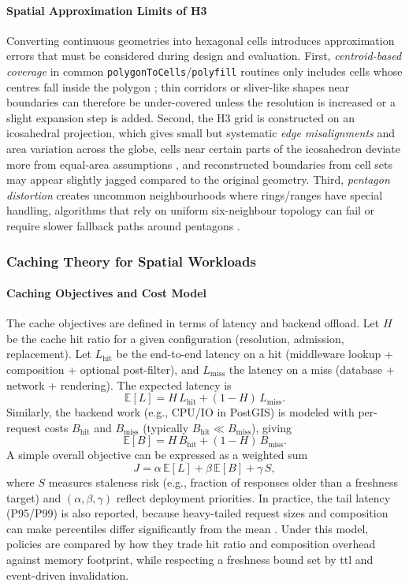 \paragraph{Spatial Approximation Limits of H3}
Converting continuous geometries into hexagonal cells introduces approximation errors that must be considered during design and evaluation. First, \emph{centroid-based coverage} in common \texttt{polygonToCells}/\texttt{polyfill} routines only includes cells whose centres fall inside the polygon \cite{H3_API_Regions}; thin corridors or sliver-like shapes near boundaries can therefore be under-covered unless the resolution is increased or a slight expansion step is added. Second, the H3 grid is constructed on an icosahedral projection, which gives small but systematic \emph{edge misalignments} and area variation across the globe, cells near certain parts of the icosahedron deviate more from equal-area assumptions \cite{H3_Core_ResTable}, and reconstructed boundaries from cell sets may appear slightly jagged compared to the original geometry. Third, \emph{pentagon distortion} creates uncommon neighbourhoods where rings/ranges have special handling, algorithms that rely on uniform six-neighbour topology can fail or require slower fallback paths around pentagons \cite{H3_API_Traversal}.

\subsubsection{Caching Theory for Spatial Workloads}

\paragraph{Caching Objectives and Cost Model}
The cache objectives are defined in terms of latency and backend offload. Let $H$ be the cache hit ratio for a given configuration (resolution, admission, replacement). Let $L_\mathrm{hit}$ be the end-to-end latency on a hit (middleware lookup + composition + optional post-filter), and $L_\mathrm{miss}$ the latency on a miss (database + network + rendering). The expected latency is
\[
\mathbb{E}[L] = H\,L_\mathrm{hit} + (1-H)\,L_\mathrm{miss}.
\]
Similarly, the backend work (e.g., CPU/IO in PostGIS) is modeled with per-request costs $B_\mathrm{hit}$ and $B_\mathrm{miss}$ (typically $B_\mathrm{hit}\!\ll\!B_\mathrm{miss}$), giving
\[
\mathbb{E}[B] = H\,B_\mathrm{hit} + (1-H)\,B_\mathrm{miss}.
\]
A simple overall objective can be expressed as a weighted sum
\[
J = \alpha\,\mathbb{E}[L] + \beta\,\mathbb{E}[B] + \gamma\,S,
\]
where $S$ measures staleness risk (e.g., fraction of responses older than a freshness target) and $(\alpha,\beta,\gamma)$ reflect deployment priorities. In practice, the tail latency (P95/P99) is also reported, because heavy-tailed request sizes and composition can make percentiles differ significantly from the mean \cite{Dean_2013}. Under this model, policies are compared by how they trade hit ratio and composition overhead against memory footprint, while respecting a freshness bound set by \ac{ttl} and event-driven invalidation.

